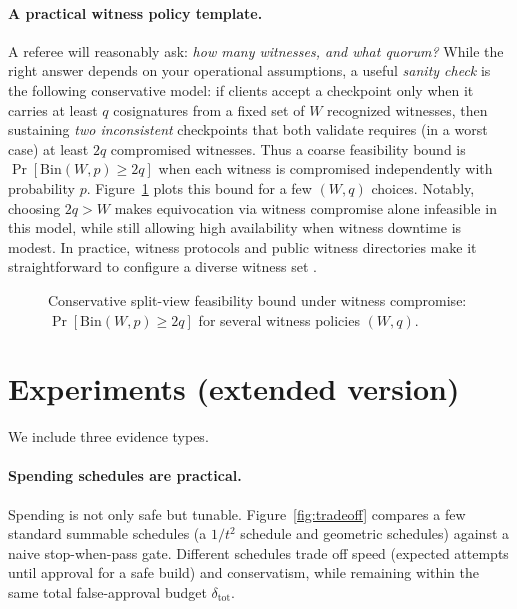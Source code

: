 \documentclass[11pt]{article}
\begin{document}
\paragraph{A practical witness policy template.}
A referee will reasonably ask: \emph{how many witnesses, and what quorum?}
While the right answer depends on your operational assumptions, a useful \emph{sanity check} is the following conservative model:
if clients accept a checkpoint only when it carries at least $q$ cosignatures from a fixed set of $W$ recognized witnesses,
then sustaining \emph{two inconsistent} checkpoints that both validate requires (in a worst case) at least $2q$ compromised witnesses.
Thus a coarse feasibility bound is $\Pr[\mathrm{Bin}(W,p)\ge 2q]$ when each witness is compromised independently with probability $p$.
Figure~\ref{fig:witness_quorum} plots this bound for a few $(W,q)$ choices.
Notably, choosing $2q>W$ makes equivocation via witness compromise alone infeasible in this model, while still allowing high availability when witness downtime is modest.
In practice, witness protocols and public witness directories make it straightforward to configure a diverse witness set \cite{c2sp_tlog_witness}.

\begin{figure}[t]
\centering
{}
\caption{Conservative split-view feasibility bound under witness compromise: $\Pr[\mathrm{Bin}(W,p)\ge 2q]$ for several witness policies $(W,q)$.}
\label{fig:witness_quorum}
\end{figure}

\section{Experiments (extended version)}
We include three evidence types.

\paragraph{Spending schedules are practical.}
Spending is not only safe but tunable. Figure~\ref{fig:tradeoff} compares a few standard summable schedules
(a $1/t^2$ schedule and geometric schedules) against a naive stop-when-pass gate.
Different schedules trade off speed (expected attempts until approval for a safe build) and conservatism,
while remaining within the same total false-approval budget $\delta_{\mathrm{tot}}$.
\end{document}
